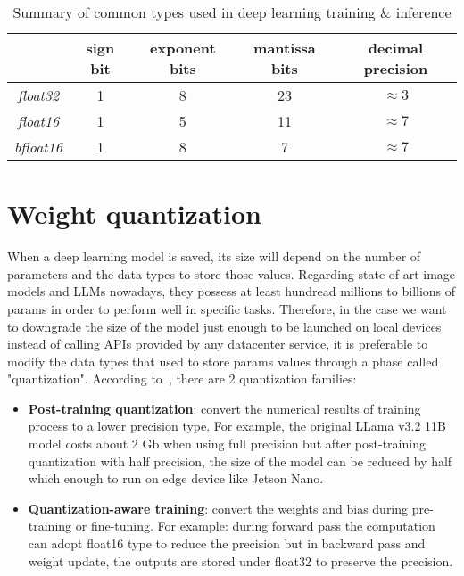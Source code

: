 \begin{table}[H]
    \centering
    \begin{tabular}{|c|c|c|c|c|}
        \hline
        & sign bit & exponent bits & mantissa bits & decimal precision\\
        \hline
        \textit{float32} & 1 & 8 & 23 & $\approx 3$\\
        \hline
        \textit{float16} & 1 & 5 & 11 & $\approx 7$\\
        \hline
        \textit{bfloat16} & 1 & 8 & 7 & $\approx 7$\\
        \hline
    \end{tabular}
    \caption{Summary of common types used in deep learning training \& inference}
    \label{tab:types}
\end{table}



\section{Weight quantization}
When a deep learning model is saved, its size will depend on the number of parameters and the data types to store those values. Regarding state-of-art image models and LLMs nowadays, they possess at least hundread millions to billions of params in order to perform well in specific tasks. Therefore, in the case we want to downgrade the size of the model just enough to be launched on local devices instead of calling APIs provided by any datacenter service, it is preferable to modify the data types that used to store params values through a phase called "quantization". According to~\cite{weight_quantization}, there are 2 quantization families:
\begin{itemize}
    \item \textbf{Post-training quantization}: convert the numerical results of training process to a lower precision type. For example, the original LLama v3.2 11B model costs about 2 Gb when using full precision but after post-training quantization with half precision, the size of the model can be reduced by half which enough to run on edge device like Jetson Nano.
    \item \textbf{Quantization-aware training}: convert the weights and bias during pre-training or fine-tuning. For example: during forward pass the computation can adopt float16 type to reduce the precision but in backward pass and weight update, the outputs are stored under float32 to preserve the precision. 
\end{itemize}

